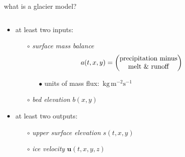 \documentclass[svgnames,
               hyperref={colorlinks,citecolor=DeepPink4,linkcolor=FireBrick,urlcolor=Maroon},
               usepdftitle=false]  %
               {beamer}
\newcommand{\bu}{\mathbf{u}}
\begin{document}
\begin{frame}{what is a glacier model?}

\begin{columns}
\begin{column}{0.6\textwidth}
\begin{itemize}
\begin{definition}
a \alert{glacier} or \alert{ice sheet model} is a \underline{map}

which evolves a glacier in a climate
\end{definition} 
\item at least two inputs:
    \begin{itemize}
    \item[$\circ$] \emph{surface mass balance}
$$\hspace{-7mm} a(t,x,y) = \begin{pmatrix}
\text{precipitation minus} \\
\text{melt \& runoff}
\end{pmatrix}$$

\vspace{-3mm}
        \begin{itemize}
        \item[{\scriptsize $\bullet$}] units of mass flux:\, $\text{kg}\, \text{m}^{-2} \text{s}^{-1}$
        \end{itemize}

    \item[$\circ$] \emph{bed elevation} $b(x,y)$
    \end{itemize}
\item at least two outputs:
    \begin{itemize}
    \item[$\circ$] \emph{upper surface elevation} $s(t,x,y)$
    \item[$\circ$] \emph{ice velocity} $\bu(t,x,y,z)$
    \end{itemize}


\end{itemize}
\end{column}
\end{columns}
\end{frame}
\end{document}
